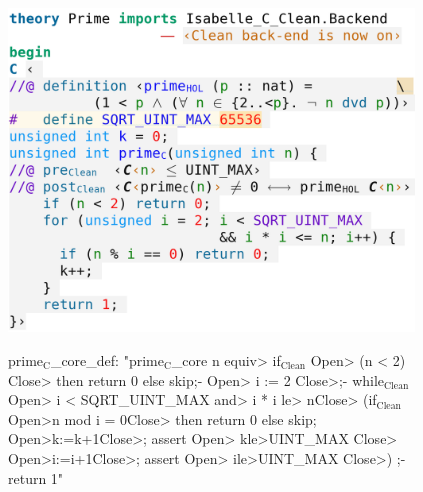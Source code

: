 \begin{isabellebody}
\begin{isamarkuptext}
\begin{figure}
  \centering
  \begin{minipage}{0.53\linewidth}
  \includegraphics[width=0.96\textwidth]{figures/A-C-Source7}
  \end{minipage}
  \begin{minipage}{0.45\linewidth}
\begin{isar}
prime$_{\text{C}}$_core_def: "prime$_{\text{C}}$_core n \<equiv>
  if$_{\text{Clean}}$ \<Open> (n < 2) \<Close> then return 0 else skip;-
  \<Open> i := 2 \<Close>;-
  while$_{\text{Clean}}$ \<Open> i < SQRT_UINT_MAX \<and> i * i \<le> n\<Close>
    (if$_{\text{Clean}}$ \<Open>n mod i = 0\<Close>
      then return 0 else skip;
     \<Open>k:=k+1\<Close>; assert \<Open> k\<le>UINT_MAX \<Close>
     \<Open>i:=i+1\<Close>; assert \<Open> i\<le>UINT_MAX \<Close>) ;-
  return 1"


\end{isar}
\end{minipage}
\end{figure}
\end{isamarkuptext}
\end{isabellebody}
